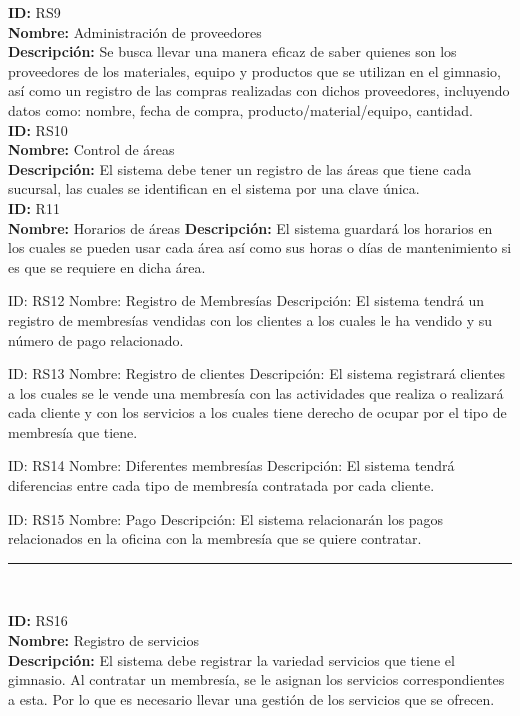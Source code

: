 \textbf{ID:} RS9\\
\textbf{Nombre:}  Administración de proveedores\\
\textbf{Descripción:} Se busca llevar una manera eficaz de saber quienes son los proveedores de los materiales, equipo y productos que se utilizan en el gimnasio, así como un registro de las compras realizadas con dichos proveedores, incluyendo datos como: nombre, fecha de compra, producto/material/equipo, cantidad.\\

\textbf{ID:} RS10\\
\textbf{Nombre:} Control de áreas\\
\textbf{Descripción:} El sistema debe tener un registro de las áreas que tiene cada sucursal, las cuales se identifican en el sistema por una clave única.\\

\textbf{ID:} R11\\
\textbf{Nombre:} Horarios de áreas
\textbf{Descripción:} El sistema guardará los horarios en los cuales se pueden usar cada área así como sus horas o días de mantenimiento si es que se requiere en dicha área.

ID: RS12
Nombre: Registro de Membresías
Descripción: El sistema tendrá un registro de membresías vendidas con los clientes a los cuales le ha vendido y su número de pago relacionado.

ID: RS13
Nombre: Registro de clientes
Descripción: El sistema registrará clientes a los cuales se le vende una membresía con las actividades que realiza o realizará cada cliente y con los servicios a los cuales tiene derecho de ocupar por el tipo de membresía que tiene.

ID: RS14
Nombre: Diferentes membresías
Descripción: El sistema tendrá diferencias entre cada tipo de membresía contratada por cada cliente.

ID: RS15
Nombre: Pago
Descripción: El sistema relacionarán los pagos relacionados en la oficina con la membresía que se quiere contratar.
\vspace*{0.3in}
\rule{150mm}{0.1mm}\\
\vspace*{0.1in}

\textbf{ID:} RS16 \\
\textbf{Nombre: } Registro de servicios  \\
\textbf{Descripci\'on: } El sistema debe registrar la variedad servicios que tiene el gimnasio. Al contratar un membresía, se le asignan los servicios correspondientes a esta. Por lo que es necesario llevar una gestión de los servicios que se ofrecen. 

